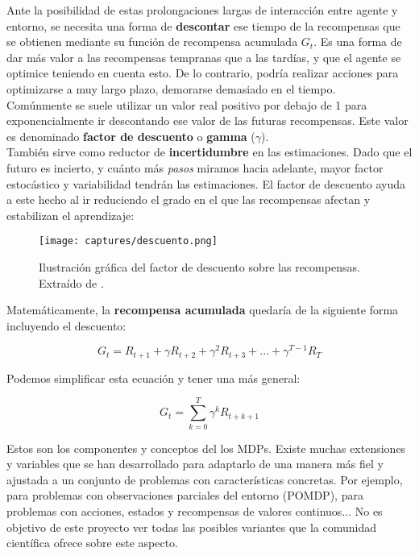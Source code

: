 \documentclass[11pt,fleqn]{book} %
\begin{document}
Ante la posibilidad de estas prolongaciones largas de interacción entre agente y entorno, se necesita una forma de \textbf{descontar} ese tiempo de la recompensas que se obtienen mediante su función de recompensa acumulada $G_t$. Es una forma de dar más valor a las recompensas tempranas que a las tardías, y que el agente se optimice teniendo en cuenta esto. De lo contrario, podría realizar acciones para optimizarse a muy largo plazo, demorarse demasiado en el tiempo. \\

Comúnmente se suele utilizar un valor real positivo por debajo de 1 para exponencialmente ir descontando ese valor de las futuras recompensas. Este valor es denominado \textbf{factor de descuento} o \textbf{gamma} ($\gamma$). \\

También sirve como reductor de \textbf{incertidumbre} en las estimaciones. Dado que el futuro es incierto, y cuánto más \textit{pasos} miramos hacia adelante, mayor factor estocástico y variabilidad tendrán las estimaciones. El factor de descuento ayuda a este hecho al ir reduciendo el grado en el que las recompensas afectan y estabilizan el aprendizaje: \\

\begin{figure}[H]
	\centering\texttt{[image: captures/descuento.png]}
	\caption{Ilustración gráfica del factor de descuento sobre las recompensas. Extraído de \cite{book:miguel}.}
	\label{fig:descuento} %
\end{figure}

Matemáticamente, la \textbf{recompensa acumulada} quedaría de la siguiente forma incluyendo el descuento:

\begin{equation}
G_t=R_{t+1}+\gamma R_{t+2}+ \gamma^2R_{t+3}+...+\gamma^{T-1}R_T
\end{equation}

Podemos simplificar esta ecuación y tener una más general:

\begin{equation}
G_t=\sum^T_{k=0}\gamma^kR_{t+k+1}
\end{equation}

Estos son los componentes y conceptos del los MDPs. Existe muchas extensiones y variables que se han desarrollado para adaptarlo de una manera más fiel y ajustada a un conjunto de problemas con características concretas. Por ejemplo, para problemas con observaciones parciales del entorno (POMDP), para problemas con acciones, estados y recompensas de valores continuos... No es objetivo de este proyecto ver todas las posibles variantes que la comunidad científica ofrece sobre este aspecto.
\end{document}
